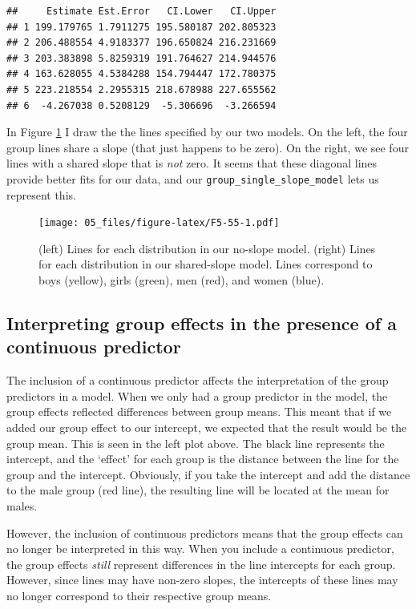 \documentclass[
]{book}
\begin{document}
\begin{verbatim}
##     Estimate Est.Error   CI.Lower   CI.Upper
## 1 199.179765 1.7911275 195.580187 202.805323
## 2 206.488554 4.9183377 196.650824 216.231669
## 3 203.383898 5.8259319 191.764627 214.944576
## 4 163.628055 4.5384288 154.794447 172.780375
## 5 223.218554 2.2955315 218.678988 227.655562
## 6  -4.267038 0.5208129  -5.306696  -3.266594
\end{verbatim}

In Figure \ref{fig:F5-55} I draw the the lines specified by our two models. On the left, the four group lines share a slope (that just happens to be zero). On the right, we see four lines with a shared slope that is \emph{not} zero. It seems that these diagonal lines provide better fits for our data, and our \texttt{group\_single\_slope\_model} lets us represent this.

\begin{figure}
\centering
\texttt{[image: 05\_files/figure-latex/F5-55-1.pdf]}
\caption{\label{fig:F5-55}(left) Lines for each distribution in our no-slope model. (right) Lines for each distribution in our shared-slope model. Lines correspond to boys (yellow), girls (green), men (red), and women (blue).}
\end{figure}

\hypertarget{interpreting-group-effects-in-the-presence-of-a-continuous-predictor}{%
\subsection{Interpreting group effects in the presence of a continuous predictor}\label{interpreting-group-effects-in-the-presence-of-a-continuous-predictor}}

The inclusion of a continuous predictor affects the interpretation of the group predictors in a model. When we only had a group predictor in the model, the group effects reflected differences between group means. This meant that if we added our group effect to our intercept, we expected that the result would be the group mean. This is seen in the left plot above. The black line represents the intercept, and the `effect' for each group is the distance between the line for the group and the intercept. Obviously, if you take the intercept and add the distance to the male group (red line), the resulting line will be located at the mean for males.

However, the inclusion of continuous predictors means that the group effects can no longer be interpreted in this way. When you include a continuous predictor, the group effects \emph{still} represent differences in the line intercepts for each group. However, since lines may have non-zero slopes, the intercepts of these lines may no longer correspond to their respective group means.
\end{document}
